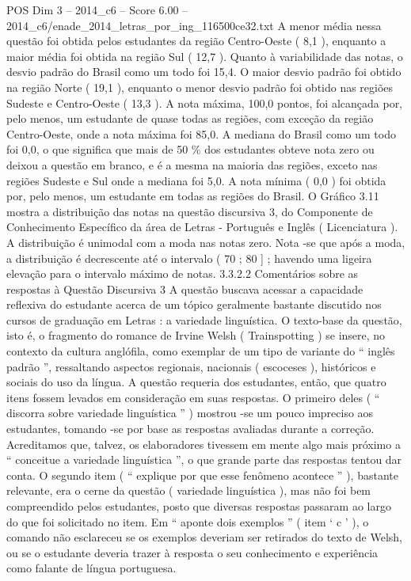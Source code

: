 \begin{textsample}{POS Dim 3 – 2014\_c6 – Score 6.00 – 2014\_c6/enade\_2014\_letras\_por\_ing\_116500ce32.txt}
A menor média nessa questão foi obtida pelos estudantes da região Centro-Oeste ( 8,1 ), enquanto a maior média foi obtida na região Sul ( 12,7 ).
Quanto à variabilidade das notas, o desvio padrão do Brasil como um todo foi 15,4.
O maior desvio padrão foi obtido na região Norte ( 19,1 ), enquanto o menor desvio padrão foi obtido nas regiões Sudeste e Centro-Oeste ( 13,3 ).
A nota máxima, 100,0 pontos, foi alcançada por, pelo menos, um estudante de quase todas as regiões, com exceção da região Centro-Oeste, onde a nota máxima foi 85,0.
A mediana do Brasil como um todo foi 0,0, o que significa que mais de 50 \% dos estudantes obteve nota zero ou deixou a questão em branco, e é a mesma na maioria das regiões, exceto nas regiões Sudeste e Sul onde a mediana foi 5,0.
A nota mínima ( 0,0 ) foi obtida por, pelo menos, um estudante em todas as regiões do Brasil.
O Gráfico 3.11 mostra a distribuição das notas na questão discursiva 3, do Componente de Conhecimento Específico da área de Letras - Português e Inglês ( Licenciatura ).
A distribuição é unimodal com a moda nas notas zero.
Nota -se que após a moda, a distribuição é decrescente até o intervalo ( 70 ; 80 ] ; havendo uma ligeira elevação para o intervalo máximo de notas. 3.3.2.2 Comentários sobre as respostas à Questão Discursiva 3 A questão buscava acessar a capacidade reflexiva do estudante acerca de um tópico geralmente bastante discutido nos cursos de graduação em Letras : a variedade linguística.
O texto-base da questão, isto é, o fragmento do romance de Irvine Welsh ( Trainspotting ) se insere, no contexto da cultura anglófila, como exemplar de um tipo de variante do “ inglês padrão ”, ressaltando aspectos regionais, nacionais ( escoceses ), históricos e sociais do uso da língua.
A questão requeria dos estudantes, então, que quatro itens fossem levados em consideração em suas respostas.
O primeiro deles ( “ discorra sobre variedade linguística ” ) mostrou -se um pouco impreciso aos estudantes, tomando -se por base as respostas avaliadas durante a correção.
Acreditamos que, talvez, os elaboradores tivessem em mente algo mais próximo a “ conceitue a variedade linguística ”, o que grande parte das respostas tentou dar conta.
O segundo item ( “ explique por que esse fenômeno acontece ” ), bastante relevante, era o cerne da questão ( variedade linguística ), mas não foi bem compreendido pelos estudantes, posto que diversas respostas passaram ao largo do que foi solicitado no item.
Em “ aponte dois exemplos ” ( item ‘ c ’ ), o comando não esclareceu se os exemplos deveriam ser retirados do texto de Welsh, ou se o estudante deveria trazer à resposta o seu conhecimento e experiência como falante de língua portuguesa.

\end{textsample}

